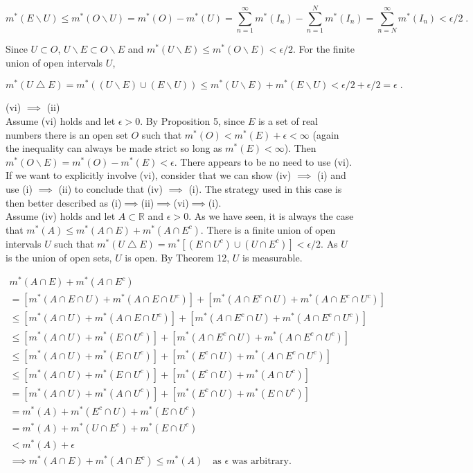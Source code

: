 \documentclass[a4paper]{article}
\begin{document}
$$m^*(E\backslash U) \leq m^*(O \backslash U) = m^*(O)-m^*(U) = \sum_{n=1}^\infty m^*(I_n) - \sum_{n=1}^N m^*(I_n) = \sum_{n=N}^\infty m^*(I_n) < \epsilon/2 \;.$$

Since $U \subset O$, $U\backslash E \subset O \backslash E$ and $m^*(U\backslash E) \leq m^*(O \backslash E) < \epsilon/2$. For the finite union of open intervals $U$, 

$$m^*\left( U \bigtriangleup E\right) = m^*\left( (U \backslash E)\cup (E \backslash U)\right) \leq m^*(U \backslash E) + m^*(E \backslash U) < \epsilon/2 + \epsilon /2 = \epsilon \;.$$
$$ $$

(vi) $\implies$ (ii)\\
Assume (vi) holds and let $\epsilon > 0$. By Proposition 5, since $E$ is a set of real numbers there is an open set $O$ such that $m^*(O) < m^*(E) + \epsilon < \infty$ (again the inequality can always be made strict so long as $m^*(E) < \infty$). Then $m^*(O\backslash E) = m^*(O) - m^*(E) < \epsilon$. There appears to be no need to use (vi). If we want to explicitly involve (vi), consider that we can show (iv) $\implies$ (i) and use (i) $\implies$ (ii) to conclude that (iv) $\implies$ (i). The strategy used in this case is then better described as (i)$\implies$(ii)$\implies$(vi)$\implies$(i).\\

Assume (iv) holds and let $A \subset \mathbb{R}$ and $\epsilon > 0$. As we have seen, it is always the case that $m^*(A) \leq m^*(A \cap E) + m^*(A \cap E^c)$. There is a finite union of open intervals $U$ such that $m^*(U \bigtriangleup E)  = m^*\left[(E\cap U^c)\cup (U \cap E^c)\right] < \epsilon / 2$. As $U$ is the union of open sets, $U$ is open. By Theorem 12, $U$ is measurable.

\begin{align*}
m^*(A\cap E) + m^*(A \cap E^c) &\\
= [m^*(A\cap E \cap U) + m^*(A \cap E \cap U^c)]
+ [m^*(A\cap E^c \cap U) + m^*(A \cap E^c \cap U^c)]& \\
 \leq [m^*(A \cap U) + m^*(A \cap E \cap U^c)] + [m^*(A\cap E^c \cap U) + m^*(A \cap E^c \cap U^c)]&\\
 \leq [m^*(A \cap U) + m^*(E \cap U^c)] + [m^*(A\cap E^c \cap U) + m^*(A \cap E^c \cap U^c)]&\\
 \leq [m^*(A \cap U) + m^*(E \cap U^c)] + [m^*(E^c \cap U) + m^*(A \cap E^c \cap U^c)]&\\
 \leq [m^*(A \cap U) + m^*(E \cap U^c)] + [m^*(E^c \cap U) + m^*(A \cap U^c)] &\\
= [m^*(A \cap U) + m^*(A \cap U^c)] + [m^*(E^c \cap U) + m^*(E \cap U^c)]& \\
 = m^*(A) + m^*(E^c \cap U) + m^*(E \cap U^c) &\\
= m^*(A) + m^*(U\cap E^c) + m^*(E \cap U^c)&\\
< m^*(A) + \epsilon & \\
\implies m^*(A\cap E) + m^*(A \cap E^c) \leq m^*(A) \quad \text{as } \epsilon \text{ was arbitrary}. &
\end{align*}
\end{document}
